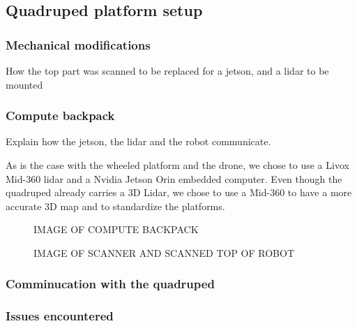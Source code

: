 \documentclass[11pt]{article}
\begin{document}
        \subsection{Quadruped platform setup}


            \subsubsection{Mechanical modifications}

            How the top part was scanned to be replaced for a jetson, and a lidar to be mounted

            \subsubsection{Compute backpack}

            Explain how the jetson, the lidar and the robot communicate.

            As is the case with the wheeled platform and the drone, we chose to use a Livox Mid-360 lidar and a Nvidia Jetson Orin embedded computer. Even though the quadruped already carries a 3D Lidar, we chose to use a Mid-360 to have a more accurate 3D map and to standardize the platforms.

            
            \begin{figure}[H]
                \centering
                IMAGE OF COMPUTE BACKPACK
            \end{figure}


            \begin{figure}[H]
                \centering
                IMAGE OF SCANNER AND SCANNED TOP OF ROBOT
            \end{figure}
            
            \subsubsection{Comminucation with the quadruped}


            \subsubsection{Issues encountered}
\end{document}
